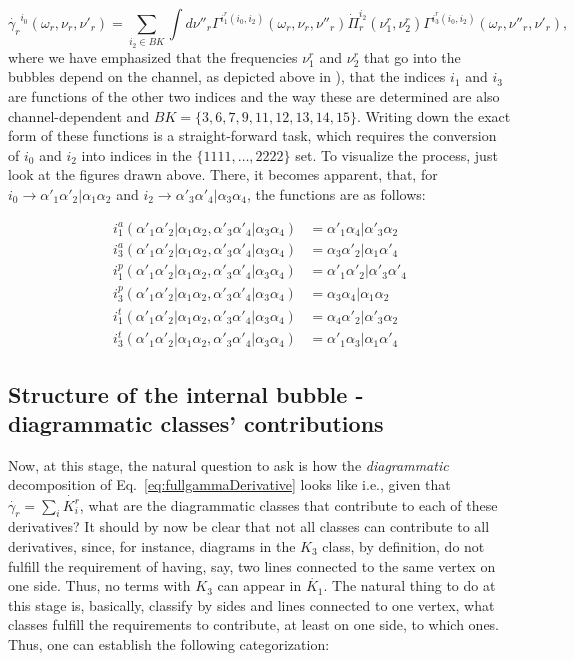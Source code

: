 \documentclass[12pt,a4paper,roman]{article}
\begin{document}
\begin{equation}
\dot{\gamma_r}^{i_0}(\omega_r, \nu_r, \nu'_r) = \sum_{i_2\in BK} \int d\nu''_r \Gamma^{i^r_1(i_0, i_2)}(\omega_r, \nu_r, \nu''_r)  \dot{\Pi}_r^{i_2}(\nu_1^r, \nu_2^r)  \Gamma^{i^r_3(i_0, i_2)}(\omega_r, \nu''_r, \nu'_r),
\label{eq:fullgammaDerivative}
\end{equation}
where we have emphasized that the frequencies $\nu^r_{1}$ and $\nu^r_2$ that go into the bubbles depend on the channel, as depicted above in ), that the indices $i_1$ and $i_3$ are functions of the other two indices and the way these are determined are also channel-dependent and $BK = \{3, 6, 7, 9, 11, 12, 13, 14, 15\}$.
Writing down the exact form of these functions is a straight-forward task, which requires the conversion of $i_0$ and $i_2$ into indices in the $\{1111, \dots, 2222\}$ set. To visualize the process, just look at the figures drawn above. There, it becomes apparent, that, for $i_0 \rightarrow \alpha'_1\alpha'_2|\alpha_1\alpha_2$ and $i_2 \rightarrow \alpha'_3\alpha'_4|\alpha_3\alpha_4$, the functions are as follows:

\begin{align}
i_1^a (\alpha'_1\alpha'_2|\alpha_1\alpha_2, \alpha'_3\alpha'_4|\alpha_3\alpha_4) &= \alpha'_1\alpha_4| \alpha'_3\alpha_2 \\
i_3^a (\alpha'_1\alpha'_2|\alpha_1\alpha_2, \alpha'_3\alpha'_4|\alpha_3\alpha_4) &= \alpha_3\alpha'_2| \alpha_1\alpha'_4 \\
i_1^p (\alpha'_1\alpha'_2|\alpha_1\alpha_2, \alpha'_3\alpha'_4|\alpha_3\alpha_4) &= \alpha'_1\alpha'_2| \alpha'_3\alpha'_4 \\
i_3^p (\alpha'_1\alpha'_2|\alpha_1\alpha_2, \alpha'_3\alpha'_4|\alpha_3\alpha_4) &= \alpha_3\alpha_4| \alpha_1\alpha_2 \\
i_1^t (\alpha'_1\alpha'_2|\alpha_1\alpha_2, \alpha'_3\alpha'_4|\alpha_3\alpha_4) &= \alpha_4\alpha'_2| \alpha'_3\alpha_2 \\
i_3^t (\alpha'_1\alpha'_2|\alpha_1\alpha_2, \alpha'_3\alpha'_4|\alpha_3\alpha_4) &= \alpha'_1\alpha_3| \alpha_1\alpha'_4
\end{align}
\subsection*{Structure of the internal bubble - diagrammatic classes' contributions}
Now, at this stage, the natural question to ask is how the \textit{diagrammatic} decomposition of Eq.~\eqref{eq:fullgammaDerivative} looks like i.e., given that $\dot{\gamma_r} = \sum_i \dot{K_i^r}$, what are the diagrammatic classes that contribute to each of these derivatives? It should by now be clear that not all classes can contribute to all derivatives, since, for instance, diagrams in the $K_3$ class, by definition, do not fulfill the requirement of having, say, two lines connected to the same vertex on one side. Thus, no terms with $K_3$ can appear in $\dot{K_1}$.
The natural thing to do at this stage is, basically, classify by sides and lines connected to one vertex, what classes fulfill the requirements to contribute, at least on one side, to which ones.
Thus, one can establish the following categorization:
\end{document}
